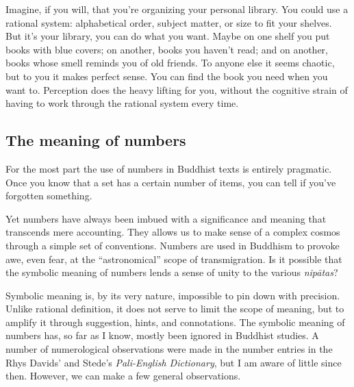 \documentclass[12pt,openany]{book}%
\begin{document}
Imagine, if you will, that you’re organizing your personal library. You could use a rational system: alphabetical order, subject matter, or size to fit your shelves. But it’s your library, you can do what you want. Maybe on one shelf you put books with blue covers; on another, books you haven’t read; and on another, books whose smell reminds you of old friends. To anyone else it seems chaotic, but to you it makes perfect sense. You can find the book you need when you want to. Perception does the heavy lifting for you, without the cognitive strain of having to work through the rational system every time.

\subsection*{The meaning of numbers}

For the most part the use of numbers in Buddhist texts is entirely pragmatic. Once you know that a set has a certain number of items, you can tell if you’ve forgotten something.

Yet numbers have always been imbued with a significance and meaning that transcends mere accounting. They allows us to make sense of a complex cosmos through a simple set of conventions. Numbers are used in Buddhism to provoke awe, even fear, at the “astronomical” scope of transmigration. Is it possible that the symbolic meaning of numbers lends a sense of unity to the various \textit{\textsanskrit{nipātas}}?

Symbolic meaning is, by its very nature, impossible to pin down with precision. Unlike rational definition, it does not serve to limit the scope of meaning, but to amplify it through suggestion, hints, and connotations. The symbolic meaning of numbers has, so far as I know, mostly been ignored in Buddhist studies. A number of numerological observations were made in the number entries in the Rhys Davids’ and Stede’s \textit{Pali-English Dictionary}, but I am aware of little since then. However, we can make a few general observations.
\end{document}
